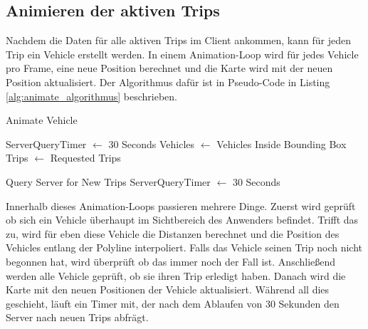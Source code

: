 \subsection{Animieren der aktiven Trips}
\label{sub:animieren_der_aktiven_trips}
  Nachdem die Daten für alle aktiven Trips im Client ankommen, kann für jeden Trip ein Vehicle erstellt werden. In einem Animation-Loop wird für jedes Vehicle pro Frame, eine neue Position berechnet und die Karte wird mit der neuen Position aktualisiert. Der Algorithmus dafür ist in Pseudo-Code in Listing \ref{alg:animate_algorithmus} beschrieben.

  \begin{algorithm}[H]
    \caption{Animate Vehicle}\label{alg:animate_algorithmus}
    \begin{algorithmic}[1]
        \State ServerQueryTimer $\gets$ 30 Seconds
        \State Vehicles $\gets$ Vehicles Inside Bounding Box
        \State Trips $\gets$ Requested Trips
           \EndFor

            \State Query Server for New Trips
            \State ServerQueryTimer $\gets$ 30 Seconds
          \EndIf

          \State {}
        \EndFunction
        
      \EndProcedure
    \end{algorithmic}
  \end{algorithm}

  Innerhalb dieses Animation-Loops passieren mehrere Dinge. Zuerst wird geprüft ob sich ein Vehicle überhaupt im Sichtbereich des Anwenders befindet. Trifft das zu, wird für eben diese Vehicle die Distanzen berechnet und die Position des Vehicles entlang der Polyline interpoliert. Falls das Vehicle seinen Trip noch nicht begonnen hat, wird überprüft ob das immer noch der Fall ist. Anschließend werden alle Vehicle geprüft, ob sie ihren Trip erledigt haben. Danach wird die Karte mit den neuen Positionen der Vehicle aktualisiert. Während all dies geschieht, läuft ein Timer mit, der nach dem Ablaufen von 30 Sekunden den Server nach neuen Trips abfrägt.

